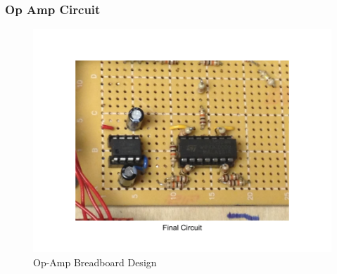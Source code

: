 \documentclass{beamer}
\begin{document}
\begin{frame}
	\frametitle{Op Amp Circuit}
	\begin{figure}
		\centering 
		\includegraphics[scale=.3]{figures/png/SeniorDesignPresentation-2.png}
		\caption{Op-Amp Breadboard Design}
	\end{figure}	
\end{frame}
\end{document}
